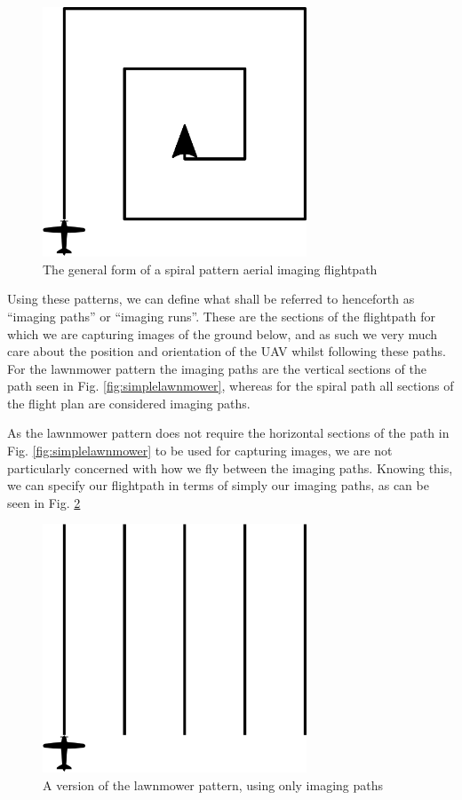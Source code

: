 \begin{figure}[htbp!] 
\centering    
\includegraphics[width=0.7\textwidth]{SimpleSpiral}
\caption[Simple Spiral Pattern]{The general form of a spiral pattern aerial imaging flightpath}
\label{fig:simplespiral}
\end{figure}

Using these patterns, we can define what shall be referred to henceforth as ``imaging paths'' or ``imaging runs''. These are the sections of the flightpath for which we are capturing images of the ground below, and as such we very much care about the position and orientation of the UAV whilst following these paths. For the lawnmower pattern the imaging paths are the vertical sections of the path seen in Fig. \ref{fig:simplelawnmower}, whereas for the spiral path all sections of the flight plan are considered imaging paths. 

As the lawnmower pattern does not require the horizontal sections of the path in Fig. \ref{fig:simplelawnmower} to be used for capturing images, we are not particularly concerned with how we fly between the imaging paths. Knowing this, we can specify our flightpath in terms of simply our imaging paths, as can be seen in Fig. \ref{fig:imaginglawnmower}

\begin{figure}[htbp!] 
\centering    
\includegraphics[width=0.7\textwidth]{ImagingLawnmower}
\caption[Imaging Lawnmower Pattern]{A version of the lawnmower pattern, using only imaging paths}
\label{fig:imaginglawnmower}
\end{figure}

